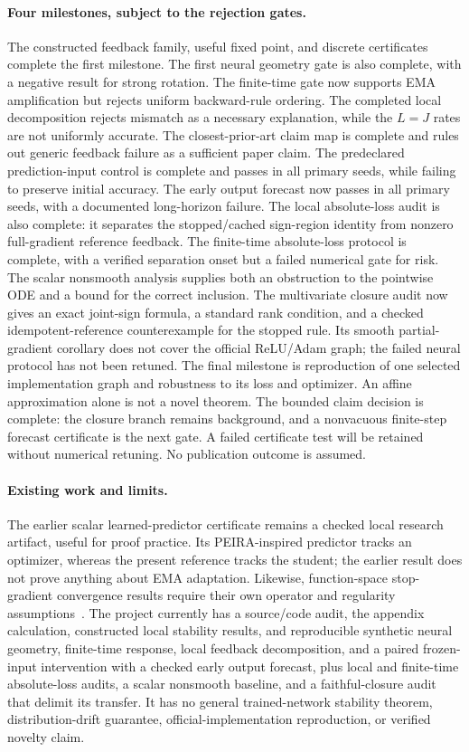 \documentclass[11pt,a4paper]{article}
\begin{document}
\paragraph{Four milestones, subject to the rejection gates.}
The constructed feedback family, useful fixed point, and discrete
certificates complete the first milestone. The first neural geometry gate
is also complete, with a negative result for strong rotation. The finite-time
gate now supports EMA amplification but rejects uniform backward-rule
ordering. The completed local decomposition rejects mismatch as a
necessary explanation, while the $L=J$ rates are not uniformly
accurate. The closest-prior-art claim map is complete and rules out
generic feedback failure as a sufficient paper claim. The predeclared
prediction-input control is complete and passes in all primary seeds,
while failing to preserve initial accuracy. The early output forecast
now passes in all primary seeds, with a documented long-horizon failure.
The local absolute-loss audit is also complete: it separates the
stopped/cached sign-region identity from nonzero full-gradient reference
feedback. The finite-time absolute-loss protocol is complete, with a
verified separation onset but a failed numerical gate for risk. The
scalar nonsmooth analysis supplies both an obstruction to the pointwise
ODE and a bound for the correct inclusion. The multivariate closure audit
now gives an exact joint-sign formula, a standard rank condition, and
a checked idempotent-reference counterexample for the stopped rule.
Its smooth partial-gradient corollary does not cover the official
ReLU/Adam graph; the failed neural protocol has not been retuned.
The final milestone is reproduction of one selected implementation graph
and robustness to its loss and optimizer. An affine approximation alone is not a novel theorem.
The bounded claim decision is complete: the closure branch remains
background, and a nonvacuous finite-step forecast certificate is the next
gate. A failed certificate test will be retained without numerical retuning.
No publication outcome is assumed.

\paragraph{Existing work and limits.}
The earlier scalar learned-predictor certificate remains a checked local
research artifact, useful for proof practice. Its PEIRA-inspired predictor
tracks an optimizer, whereas the present reference tracks the student;
the earlier result does not prove anything about EMA adaptation. Likewise,
function-space stop-gradient convergence results require their own operator
and regularity assumptions~\cite{stopgrads}. The project currently has a source/code audit, the appendix calculation,
constructed local stability results, and reproducible synthetic neural
geometry, finite-time response, local feedback decomposition, and a
paired frozen-input intervention with a checked early output forecast,
plus local and finite-time absolute-loss audits, a scalar nonsmooth
baseline, and a faithful-closure audit that delimit its transfer.
It has no general trained-network stability theorem,
distribution-drift guarantee, official-implementation reproduction,
or verified novelty claim.
\end{document}
